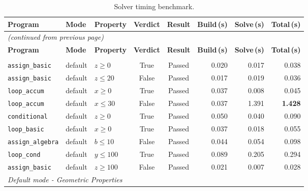 {\small
\setlength{\LTleft}{0pt plus 1fill}
\setlength{\LTright}{0pt plus 1fill}
\begin{longtable}{p{} p{} p{} c c r r r}
\caption{Solver timing benchmark.}
\label{tab:timing} \\
\toprule
\textbf{Program} & \textbf{Mode} & \textbf{Property} & \textbf{Verdict} & \textbf{Result} & \textbf{Build\,(s)} & \textbf{Solve\,(s)} & \textbf{Total\,(s)} \\
\midrule
\endfirsthead
\multicolumn{8}{l}{\small\itshape (continued from previous page)} \\
\toprule
\textbf{Program} & \textbf{Mode} & \textbf{Property} & \textbf{Verdict} & \textbf{Result} & \textbf{Build\,(s)} & \textbf{Solve\,(s)} & \textbf{Total\,(s)} \\
\midrule
\endhead
\bottomrule
\endfoot
\bottomrule
\endlastfoot
\multicolumn{8}{l}{\textit{Default mode - Arithmetic Properties}} \\
\midrule
\texttt{assign\_basic}   & default & $z \geq 0$                          & True  & Passed & 0.020 & 0.017 & 0.038 \\
\texttt{assign\_basic}   & default & $z \leq 20$                         & False & Passed & 0.017 & 0.019 & 0.036 \\
\texttt{loop\_accum}     & default & $x \geq 0$                          & True  & Passed & 0.037 & 0.008 & 0.045 \\
\texttt{loop\_accum}     & default & $x \leq 30$                         & False & Passed & 0.037 & 1.391 & \textbf{1.428} \\
\texttt{conditional}     & default & $z \geq 0$                          & True  & Passed & 0.050 & 0.040 & 0.090 \\
\texttt{loop\_basic}     & default & $x \geq 0$                          & True  & Passed & 0.037 & 0.018 & 0.055 \\
\texttt{assign\_algebra} & default & $b \leq 10$                         & False & Passed & 0.044 & 0.054 & 0.098 \\
\texttt{loop\_cond}      & default & $y \leq 100$                        & True  & Passed & 0.089 & 0.205 & 0.294 \\
\texttt{assign\_basic}   & default & $z \geq 100$                        & False & Passed & 0.021 & 0.007 & 0.028 \\
\midrule
\multicolumn{8}{l}{\textit{Default mode - Geometric Properties}} \\

\end{longtable}}

